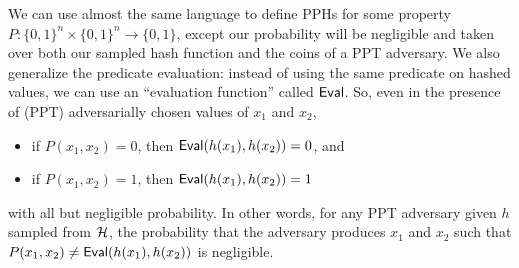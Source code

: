 We can use almost the same language to define PPHs for some property $P:\{0,1\}^n \times \{0,1\}^n \to \{0,1\}$, except our probability will be negligible and taken over both our sampled hash function and the coins of a PPT adversary. We also generalize the predicate evaluation: instead of using the same predicate on hashed values, we can use an ``evaluation function'' called $\mathsf{Eval}$. So, even in the presence of (PPT) adversarially chosen values of $x_1$ and $x_2$,
\begin{itemize}
	\item if $P(x_1, x_2) = 0$, then $\mathsf{Eval}(h(x_1), h(x_2)) = 0$, and
	\item if $P(x_1, x_2) = 1$, then $\mathsf{Eval}(h(x_1), h(x_2)) = 1$
\end{itemize}
with all but negligible probability.
In other words, for any PPT adversary given $h$ sampled from ${\cal H}$, the probability that the adversary produces $x_1$ and $x_2$ such that $P(x_1,x_2) \neq \mathsf{Eval}(h(x_1), h(x_2))$ is negligible.

